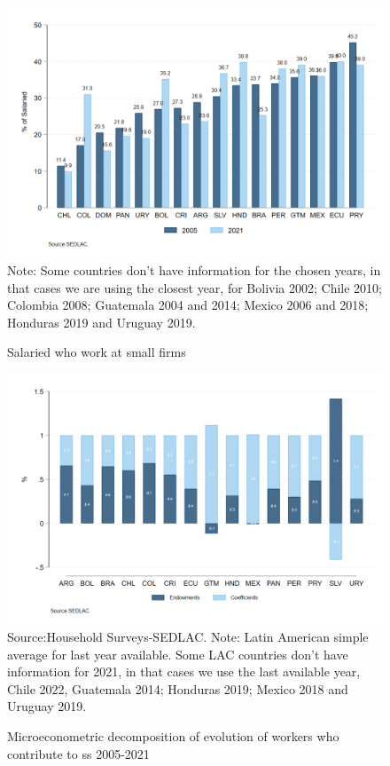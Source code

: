 \documentclass[english]{article}
\begin{document}
\begin{figure}[!htb]
    \centering
     \caption{Salaried who work at small firms}     
     \includegraphics[scale=.3]{latex/figures/Snapshot/snapshot_dependents_small.png}
    \label{fig:SalariedSmall}
    \footnotesize{Note: Some countries don’t have information for the chosen years, in that cases we are using the closest year, for Bolivia 2002; Chile 2010; Colombia 2008; Guatemala 2004 and 2014; Mexico 2006 and 2018; Honduras 2019 and Uruguay 2019.}
\end{figure}
       \begin{figure}[!htb]
        \centering
        \caption{Microeconometric decomposition of evolution of workers who contribute to ss 2005-2021}     
        \includegraphics[scale=.3]{latex/figures/Snapshot/Oaxaca decomposition.png}
        \label{fig:Oaxaca}
        \footnotesize{Source:Household Surveys-SEDLAC.}
        \footnotesize{Note: Latin American simple average for last year available. Some LAC countries don’t have information for 2021, in that cases we use the last available year, Chile 2022, Guatemala 2014; Honduras 2019; Mexico 2018 and Uruguay 2019.}
        \end{figure}
\end{document}
